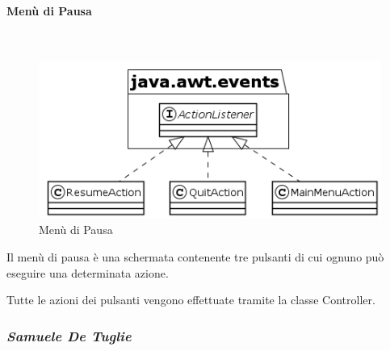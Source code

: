 \documentclass[a4paper,titlepage,12pt]{article}
\begin{document}
\paragraph{Menù di Pausa}
\par \noindent \\
\begin{figure}[H]
    \centering
    \includegraphics[scale=0.7]{img/uml/PauseMenu.png}
    \caption{Menù di Pausa}
    \label{fig: Menù di Pausa}
\end{figure}
\par \noindent Il menù di pausa è una schermata contenente tre pulsanti di cui ognuno può eseguire una determinata azione.
\par \noindent Tutte le azioni dei pulsanti vengono effettuate tramite la classe Controller.
\newpage

\subsubsection*{\large \slshape Samuele De Tuglie}
\end{document}
